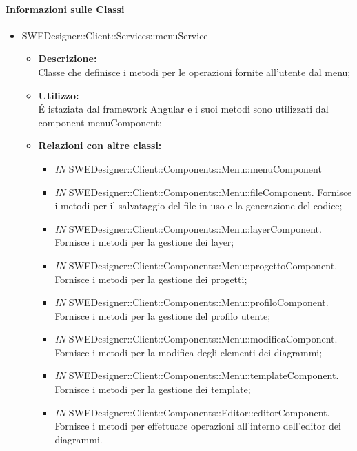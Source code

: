 \begin{itemize}
		\paragraph{Informazioni sulle Classi}
		\begin{itemize}
		\item SWEDesigner::Client::Services::menuService
		\begin{itemize}
			\item \textbf{Descrizione:}\\
			Classe che definisce i metodi per le operazioni fornite all'utente dal menu;
			\item \textbf{Utilizzo:}\\
			É istaziata dal framework Angular e i suoi metodi sono utilizzati dal component menuComponent;
			\item \textbf{Relazioni con altre classi: }
			\begin{itemize}
			\item \emph{IN} SWEDesigner::Client::Components::Menu::menuComponent
			\item \emph{IN} SWEDesigner::Client::Components::Menu::fileComponent. Fornisce i metodi per il salvataggio del file in uso e la generazione del codice;
			\item \emph{IN} SWEDesigner::Client::Components::Menu::layerComponent. Fornisce i metodi per la gestione dei layer;
			\item \emph{IN} SWEDesigner::Client::Components::Menu::progettoComponent. Fornisce i metodi per la gestione dei progetti;
			\item \emph{IN} SWEDesigner::Client::Components::Menu::profiloComponent. Fornisce i metodi per la gestione del profilo utente;
			\item \emph{IN} SWEDesigner::Client::Components::Menu::modificaComponent. Fornisce i metodi per la modifica degli elementi dei diagrammi;
			\item \emph{IN} SWEDesigner::Client::Components::Menu::templateComponent. Fornisce i metodi per la gestione dei template;
			\item \emph{IN} SWEDesigner::Client::Components::Editor::editorComponent. Fornisce i metodi per effettuare operazioni all'interno dell'editor dei diagrammi.
			\end{itemize}
		\end{itemize}
		

\end{itemize}
\end{itemize}
